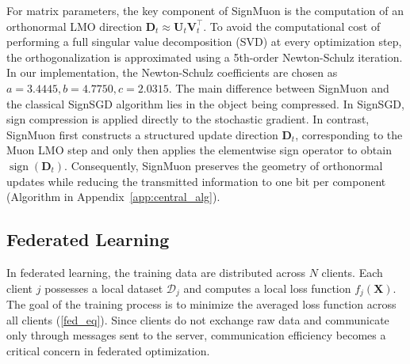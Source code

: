 \documentclass{article}
\begin{document}
For matrix parameters, the key component of SignMuon is the computation of an orthonormal LMO direction $\mathbf{D}_t \approx \mathbf{U}_t \mathbf{V}_t^\top$. To avoid the computational cost of performing a full singular value decomposition (SVD) at every optimization step, the orthogonalization is approximated using a 5th-order Newton-Schulz iteration. In our implementation, the Newton-Schulz coefficients are chosen as $a=3.4445, b=4.7750, c=2.0315$. The main difference between SignMuon and the classical SignSGD algorithm lies in the object being compressed. In SignSGD, sign compression is applied directly to the stochastic gradient. In contrast, SignMuon first constructs a structured update direction $\mathbf{D}_t$, corresponding to the Muon LMO step and only then applies the elementwise sign operator to obtain $\operatorname{sign}(\mathbf{D}_t)$. Consequently, SignMuon preserves the geometry of orthonormal updates while reducing the transmitted information to one bit per component (Algorithm in Appendix~\ref{app:central_alg}).

\subsection{Federated Learning}
In federated learning, the training data are distributed across $N$ clients. Each client $j$ possesses a local dataset $\mathcal{D}_j$ and computes a local loss function $f_j(\mathbf{X})$. The goal of the training process is to minimize the averaged loss function across all clients  (\ref{fed_eq}). Since clients do not exchange raw data and communicate only through messages sent to the server, communication efficiency becomes a critical concern in federated optimization.
\end{document}
